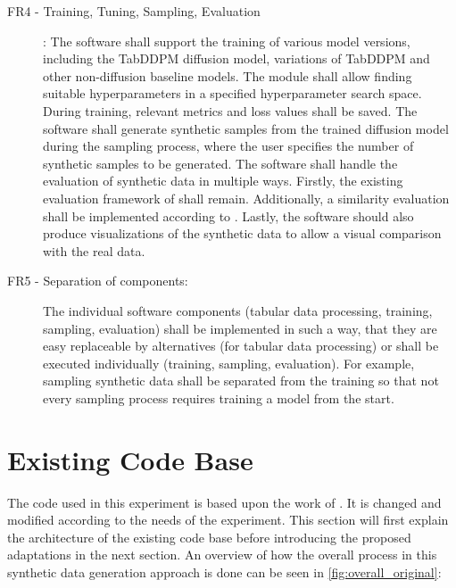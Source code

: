 \begin{description}
		\item[FR4 - Training, Tuning, Sampling, Evaluation]:
		The software shall support the training of various model versions, including the TabDDPM diffusion model, variations of TabDDPM and other non-diffusion baseline models.
		The module shall allow finding suitable hyperparameters in a specified hyperparameter search space.
		During training, relevant metrics and loss values shall be saved.
		The software shall generate synthetic samples from the trained diffusion model during the sampling process, where the user specifies the number of synthetic samples to be generated.
		The software shall handle the evaluation of synthetic data in multiple ways.
		Firstly, the existing evaluation framework of \cite{kotelnikov2022TabDDPMModellingTabular} shall remain.
		Additionally, a similarity evaluation shall be implemented according to \cite{chundawat2022UniversalMetricRobust}.
		Lastly, the software should also produce visualizations of the synthetic data to allow a visual comparison with the real data.

	\item[FR5 - Separation of components:]
		The individual software components (tabular data processing, training, sampling, evaluation) shall be implemented in such a way,
		that they are easy replaceable by alternatives (for tabular data processing) or shall be executed individually (training, sampling, evaluation).
		For example, sampling synthetic data shall be separated from the training so that not every sampling process requires training a model from the start.
\end{description}


\section{Existing Code Base}
\label{ch:conceptualDesign-existingCodeBase}

The code \cite{akim2023TabDDPMModellingTabular} used in this experiment is based upon the work of \cite{kotelnikov2022TabDDPMModellingTabular}.
It is changed and modified according to the needs of the experiment.
This section will first explain the architecture of the existing code base before introducing the proposed adaptations in the next section.
An overview of how the overall process in this synthetic data generation approach is done can be seen in \autoref{fig:overall_original}:


